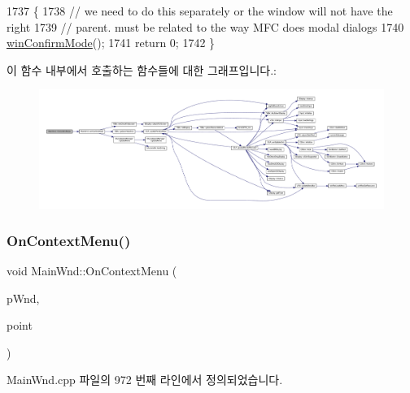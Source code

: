 \begin{DoxyCode}
1737 \{
1738   \textcolor{comment}{// we need to do this separately or the window will not have the right}
1739   \textcolor{comment}{// parent. must be related to the way MFC does modal dialogs}
1740   \mbox{\hyperlink{class_main_wnd_ac2dd4c52f72943279a8d8338edc06343}{winConfirmMode}}();
1741   \textcolor{keywordflow}{return} 0;
1742 \}
\end{DoxyCode}
이 함수 내부에서 호출하는 함수들에 대한 그래프입니다.\+:
\nopagebreak
\begin{figure}[H]
\begin{center}
\leavevmode
\includegraphics[width=350pt]{class_main_wnd_a6e5d37a503b080743b30005e2d51e28d_cgraph}
\end{center}
\end{figure}
\mbox{\label{class_main_wnd_ad3e0c95642b4f96e97e699f67e6e8d39}} 
\subsubsection{\texorpdfstring{On\+Context\+Menu()}{OnContextMenu()}}
{\footnotesize\ttfamily void Main\+Wnd\+::\+On\+Context\+Menu (\begin{DoxyParamCaption}\item[{C\+Wnd $\ast$}]{p\+Wnd,  }\item[{C\+Point}]{point }\end{DoxyParamCaption})\hspace{0.3cm}{\ttfamily [protected]}}



Main\+Wnd.\+cpp 파일의 972 번째 라인에서 정의되었습니다.


